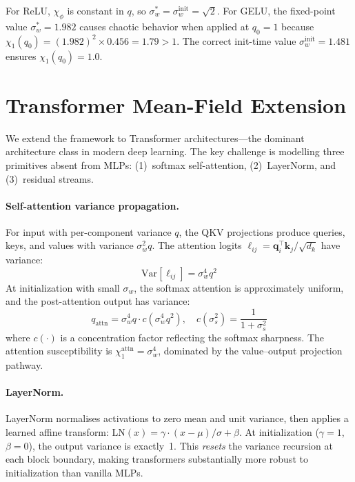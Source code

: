 \documentclass[10pt]{article}
\newcommand{\Var}{\mathrm{Var}}
\begin{document}
For ReLU, $\chi_\phi$ is constant in $q$, so $\sigma_w^* = \sigma_w^{\text{init}} = \sqrt{2}$.
For GELU, the fixed-point value $\sigma_w^* = 1.982$ causes chaotic behavior when applied at $q_0 = 1$ because $\chi_1(q_0) = (1.982)^2 \times 0.456 = 1.79 > 1$.
The correct init-time value $\sigma_w^{\text{init}} = 1.481$ ensures $\chi_1(q_0) = 1.0$.

\section{Transformer Mean-Field Extension}
\label{sec:transformer}

We extend the framework to Transformer architectures---the dominant architecture class in modern deep learning.
The key challenge is modelling three primitives absent from MLPs: (1)~softmax self-attention, (2)~LayerNorm, and (3)~residual streams.

\paragraph{Self-attention variance propagation.}
For input with per-component variance $q$, the QKV projections produce queries, keys, and values with variance $\sigma_w^2 q$.
The attention logits $\ell_{ij} = \mathbf{q}_i^\top \mathbf{k}_j / \sqrt{d_k}$ have variance:
\begin{equation}
    \Var[\ell_{ij}] = \sigma_w^4 q^2
    \label{eq:attn-logit-var}
\end{equation}
At initialization with small $\sigma_w$, the softmax attention is approximately uniform, and the post-attention output has variance:
\begin{equation}
    q_{\text{attn}} = \sigma_w^4 q \cdot c(\sigma_w^4 q^2), \quad c(\sigma_s^2) = \frac{1}{1 + \sigma_s^2}
    \label{eq:attn-output-var}
\end{equation}
where $c(\cdot)$ is a concentration factor reflecting the softmax sharpness.
The attention susceptibility is $\chi_1^{\text{attn}} = \sigma_w^4$, dominated by the value--output projection pathway.

\paragraph{LayerNorm.}
LayerNorm normalises activations to zero mean and unit variance, then applies a learned affine transform:
$\text{LN}(x) = \gamma \cdot (x - \mu) / \sigma + \beta$.
At initialization ($\gamma = 1$, $\beta = 0$), the output variance is exactly~1.
This \emph{resets} the variance recursion at each block boundary, making transformers substantially more robust to initialization than vanilla MLPs.
\end{document}

